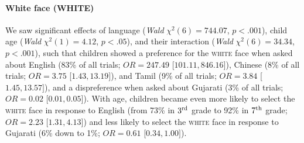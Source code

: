 \documentclass{foushee-adapted-preprint}
\begin{document}
\paragraph*{White face {\small{(WHITE)}}} 
We saw significant effects of language (\textit{Wald} $\chi^2(6)=744.07$, $p<.001$), child age (\textit{Wald} $\chi^2(1)=4.12$, $p<.05$), and their interaction (\textit{Wald} $\chi^2(6)=34.34$, $p<.001$), such that children showed a preference for the \textsc{white} face when asked about English (83\% of all trials; $OR=247.49$ [$101.11, 846.16]$), Chinese (8\% of all trials; $OR=3.75$ [$1.43, 13.19]$), and Tamil (9\% of all trials; $OR=3.84$ [$1.45, 13.57]$), and a dispreference when asked about Gujarati (3\% of all trials; $OR=0.02$ [$0.01, 0.05]$). 
With age, children became even more likely to select the \textsc{white} face in response to English (from 73\% in $3^{\textnormal{rd}}$ grade to 92\% in $7^{\textnormal{th}}$ grade; $OR=2.23$ [$1.31, 4.13]$) and less likely to select the \textsc{white} face in response to Gujarati (6\% down to 1\%; $OR=0.61$ [$0.34, 1.00]$).
\end{document}
